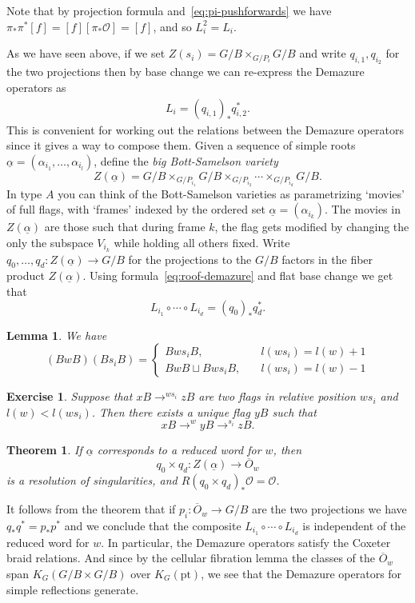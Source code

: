 \documentclass[11pt]{amsart}
\newtheorem{lemma}[dummy]{Lemma}
\newtheorem{exercise}[dummy]{Exercise}
\newtheorem{theorem}[dummy]{Theorem}
\theoremstyle{definition}
\newcommand{\Oc}{\mathcal{O}}
\numberwithin{equation}{subsection}
\numberwithin{figure}{subsection}
\newcommand{\pt}{\mathrm{pt}}
\begin{document}
Note that by projection formula and~\eqref{eq:pi-pushforwards} we have $\pi_*\pi^*[f]=[f][\pi_*\Oc]=[f]$, and so $L_i^2=L_i$.

As we have seen above, if we set $Z(s_i)=G/B\times_{G/P_i} G/B$ and write $q_{i,1},q_{i_2}$ for the two projections then by base change 
we can re-express the Demazure operators as
\begin{align}
\label{eq:roof-demazure}
L_i = (q_{i,1})_*q_{i,2}^*.
\end{align}
This is convenient for working out the relations between the Demazure operators since it gives a way to compose them.  Given a sequence of simple roots $\underline{\alpha}=(\alpha_{i_1},\ldots, \alpha_{i_l})$, define the \emph{big Bott-Samelson variety}
$$
Z(\underline{\alpha})= G/B\times_{G/P_{i_1}}G/B\times_{G/P_{i_2}}\cdots\times_{G/P_{i_d}}G/B.
$$
In type $A$ you can think of the Bott-Samelson varieties as parametrizing `movies' of full flags, with `frames' indexed by the ordered set $\underline\alpha=(\alpha_{i_k})$. The movies in $Z(\underline\alpha)$ are those such that during frame $k$, the flag gets modified by changing the only the subspace $V_{i_k}$ while holding all others fixed. 
Write $q_0,\ldots, q_d:Z(\underline\alpha)\rightarrow G/B$ for the projections to the  $G/B$ factors in the fiber product $Z(\underline\alpha)$. Using formula~\eqref{eq:roof-demazure} and flat base change we get that
$$
L_{i_1}\circ\cdots\circ L_{i_d} = (q_0)_*q_d^*.
$$



\begin{lemma}
We have 
$$
(BwB)(Bs_iB)= \begin{cases}
Bws_iB, \quad &l(ws_i)=l(w)+1\\
BwB\sqcup Bws_iB, \quad &l(ws_i)=l(w)-1
\end{cases}
$$
\end{lemma}
\begin{exercise}
Suppose that $xB\rightarrow^{ws_i}zB$ are two flags in relative position $ws_i$ and $l(w)<l(ws_i)$. Then there exists a unique flag $yB$ such that
$$
xB\rightarrow^w yB\rightarrow^{s_i} zB.
$$
\end{exercise}

\begin{theorem}
If $\underline \alpha$ corresponds to a reduced word for $w$, then 
$$
q_0\times q_d :Z(\underline\alpha)\rightarrow \overline{O}_w 
$$
is a resolution of singularities, and $R(q_0\times q_d)_*\Oc=\Oc$.
\end{theorem}
It follows from the theorem that if $p_i:\overline{O}_w \rightarrow G/B$ are the two projections we have $q_*q^*=p_*p^*$ and we conclude that the composite $L_{i_1}\circ\cdots\circ L_{i_d}$ is independent of the reduced word for $w$. In particular, the Demazure operators satisfy the Coxeter braid relations. And since by the cellular fibration lemma the classes of the $\overline{O}_w$ span $K_G(G/B\times G/B)$ over $K_G(\pt)$, we see that the Demazure operators for simple reflections generate.
\end{document}
